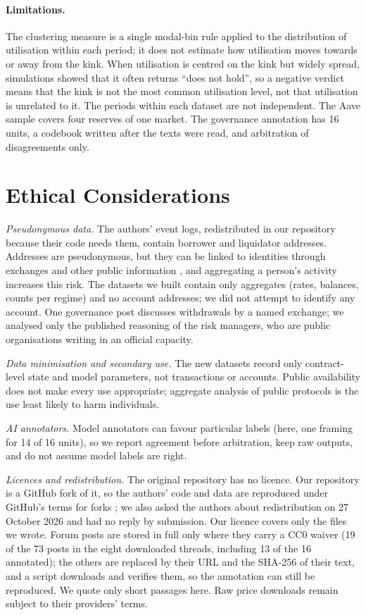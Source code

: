 \documentclass[11pt]{article}
\begin{document}
\paragraph{Limitations.} The clustering measure is a single modal-bin rule applied to the distribution of utilisation within each period; it does not estimate how utilisation moves towards or away from the kink. When utilisation is centred on the kink but widely spread, simulations showed that it often returns ``does not hold'', so a negative verdict means that the kink is not the most common utilisation level, not that utilisation is unrelated to it. The periods within each dataset are not independent. The Aave sample covers four reserves of one market. The governance annotation has 16 units, a codebook written after the texts were read, and arbitration of disagreements only.

\section{Ethical Considerations}

\emph{Pseudonymous data.} The authors' event logs, redistributed in our repository because their code needs them, contain borrower and liquidator addresses. Addresses are pseudonymous, but they can be linked to identities through exchanges and other public information \citep{meiklejohn2013fistful}, and aggregating a person's activity increases this risk. The datasets we built contain only aggregates (rates, balances, counts per regime) and no account addresses; we did not attempt to identify any account. One governance post discusses withdrawals by a named exchange; we analysed only the published reasoning of the risk managers, who are public organisations writing in an official capacity.

\emph{Data minimisation and secondary use.} The new datasets record only contract-level state and model parameters, not transactions or accounts. Public availability does not make every use appropriate; aggregate analysis of public protocols is the use least likely to harm individuals.

\emph{AI annotators.} Model annotators can favour particular labels (here, one framing for 14 of 16 units), so we report agreement before arbitration, keep raw outputs, and do not assume model labels are right.

\emph{Licences and redistribution.} The original repository has no licence. Our repository is a GitHub fork of it, so the authors' code and data are reproduced under GitHub's terms for forks \citep{github2026terms}; we also asked the authors about redistribution on 27 October 2026 and had no reply by submission. Our licence covers only the files we wrote. Forum posts are stored in full only where they carry a CC0 waiver (19 of the 73 posts in the eight downloaded threads, including 13 of the 16 annotated); the others are replaced by their URL and the SHA-256 of their text, and a script downloads and verifies them, so the annotation can still be reproduced. We quote only short passages here. Raw price downloads remain subject to their providers' terms.
\end{document}
